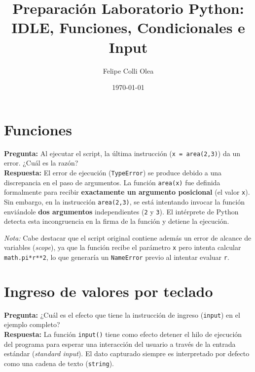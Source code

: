 \documentclass[11pt]{article}
\title{Preparación Laboratorio Python: \\ \large{IDLE, Funciones, Condicionales e Input}}
\author{Felipe Colli Olea}
\date{\today}
\begin{document}
\maketitle
\thispagestyle{fancy}

\section{Funciones}

\textbf{Pregunta:} Al ejecutar el script, la última instrucción (\texttt{x = area(2,3)}) da un error. ¿Cuál es la razón? \\

\textbf{Respuesta:} El error de ejecución (\texttt{TypeError}) se produce debido a una discrepancia en el paso de argumentos. La función \texttt{area(x)} fue definida formalmente para recibir \textbf{exactamente un argumento posicional} (el valor \texttt{x}). Sin embargo, en la instrucción \texttt{area(2,3)}, se está intentando invocar la función enviándole \textbf{dos argumentos} independientes (\texttt{2} y \texttt{3}). El intérprete de Python detecta esta incongruencia en la firma de la función y detiene la ejecución.

\textit{Nota:} Cabe destacar que el script original contiene además un error de alcance de variables (\textit{scope}), ya que la función recibe el parámetro \texttt{x} pero intenta calcular \texttt{math.pi*r**2}, lo que generaría un \texttt{NameError} previo al intentar evaluar \texttt{r}.

\section{Ingreso de valores por teclado}

\textbf{Pregunta:} ¿Cuál es el efecto que tiene la instrucción de ingreso (\texttt{input}) en el ejemplo completo? \\

\textbf{Respuesta:} La función \texttt{input()} tiene como efecto detener el hilo de ejecución del programa para esperar una interacción del usuario a través de la entrada estándar (\textit{standard input}). El dato capturado siempre es interpretado por defecto como una cadena de texto (\texttt{string}). 
\end{document}
